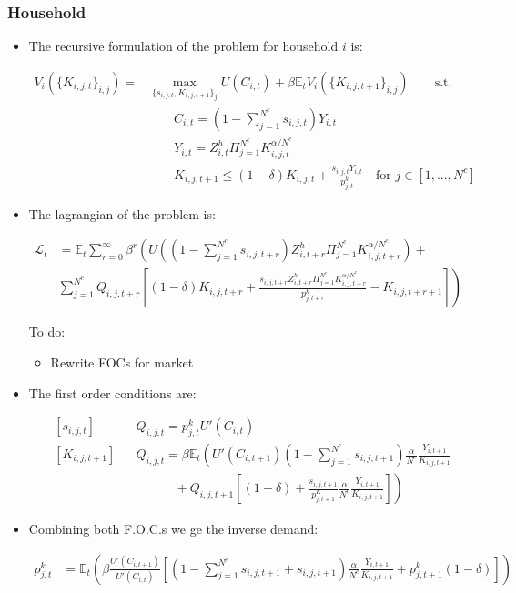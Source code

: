 \documentclass[11pt]{article}
\newcommand{\E}{\mathbb{E}}
\numberwithin{equation}{section}
\begin{document}
\subsubsection{Household}
\begin{itemize}
	
	\item The recursive formulation of the problem for household $i$ is:
	
	
	\begin{align*}
	V_i \left(\{K_{i,j,t}\}_{i,j}\right) = &\max_{\{s_{i,j,t},K_{i,j,t+1}\}_{j}}  U(C_{i,t}) + \beta \E_t V_i(\{K_{i,j,t+1}\}_{i,j}) \qquad \text{s.t.}\\
	&\qquad
	C_{i,t} = (1-\sum_{j=1}^{N^c} s_{i,j,t})Y_{i,t} \\
	&\qquad
	Y_{i,t}=Z^h_{i,t} \Pi_{j=1}^{N^c} K_{i,j,t}^{\alpha/N^c}\\
	&\qquad
	K_{i,j,t+1} \leq (1-\delta) K_{i,j,t} + \frac{s_{i,j,t} Y_{i,t}}{p^k_{j,t}}  \quad \text{for } j \in [1,...,N^c] 
	\end{align*}
	
	
	\item The lagrangian of the problem is: 
	
	\begin{align*}
	\mathcal{L}_{t} &= \E_t \sum_{r=0}^{\infty}\beta^r  \left( U\left( (1-\sum_{j=1}^{N^c} s_{i,j,t+r})Z^h_{i,t+r}\Pi_{j=1}^{N^c} K_{i,j,t+r}^{\alpha/N^c}  \right) + \right. \\
	& 	\left. \sum_{j=1}^{N^c}  Q_{i,j,t+r} \left[(1-\delta) K_{i,j,t+r} +\frac{s_{i,j,t+r}Z^h_{i,t+r} \Pi_{j=1}^{N^c} K_{i,j,t+r}^{\alpha/N^c}}{p^k_{j,t+r}} -K_{i,j,t+r+1}\right] \right)
	\end{align*}
	
	{\color{red} To do: 
		\begin{itemize}
			\item Rewrite FOCs for market
	\end{itemize}}
	\item The first order conditions are:
	
	\begin{align*}
	& \left[s_{i,j,t}\right] && Q_{i,j,t}  =p^k_{j,t} U'(C_{i,t}) \\
	& \left[K_{i,j,t+1}\right] && Q_{i,j,t} = \beta \E_t \left(U'(C_{i,t+1}) (1-\sum_{j=1}^{N^c} s_{i,j,t+1}) \frac{\alpha}{N^c} \frac{Y_{i,t+1}}{K_{i,j,t+1}} \right. \\
	& && \left. \quad  \qquad + Q_{i,j,t+1} \left[ (1-\delta) + \frac{s_{i,j,t+1}}{p_{j,t+1}^K}  \frac{\alpha}{N^c} \frac{Y_{i,t+1}}{K_{i,j,t+1}} \right]  \right)
	\end{align*}
	
	\item Combining both F.O.C.s we ge the inverse demand:
	
	\begin{align}
	p^k_{j,t}  & =   \E_t \left( \beta \frac{U'(C_{i,t+1})}{U'(C_{i,t})} \left[ (1-\sum_{j=1}^{N^c} s_{i,j,t+1} + s_{i,j,t+1}) \frac{\alpha}{N^c} \frac{Y_{i,t+1}}{K_{i,j,t+1}} + p^k_{j,t+1} (1-\delta)  \right]  \right)
	\end{align}
	
\end{itemize}
\end{document}

